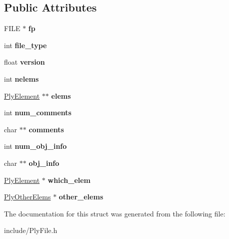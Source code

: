 \subsection*{Public Attributes}
\begin{DoxyCompactItemize}
\item 
\hypertarget{structPlyFile_affa03cb65d7afdc1b54ba1930da1e0ce}{F\-I\-L\-E $\ast$ {\bfseries fp}}\label{structPlyFile_affa03cb65d7afdc1b54ba1930da1e0ce}

\item 
\hypertarget{structPlyFile_ac8f47215e1cab6332c4a91735faceac1}{int {\bfseries file\-\_\-type}}\label{structPlyFile_ac8f47215e1cab6332c4a91735faceac1}

\item 
\hypertarget{structPlyFile_a54079430fc47c9303c194ecffaf9392d}{float {\bfseries version}}\label{structPlyFile_a54079430fc47c9303c194ecffaf9392d}

\item 
\hypertarget{structPlyFile_a2d94dc0c534e364b232d1ea41d64c1f1}{int {\bfseries nelems}}\label{structPlyFile_a2d94dc0c534e364b232d1ea41d64c1f1}

\item 
\hypertarget{structPlyFile_aa123ddfd8c89539dde7644d121082432}{\hyperlink{structPlyElement}{Ply\-Element} $\ast$$\ast$ {\bfseries elems}}\label{structPlyFile_aa123ddfd8c89539dde7644d121082432}

\item 
\hypertarget{structPlyFile_a033842a20f0620979d992898f6a52a14}{int {\bfseries num\-\_\-comments}}\label{structPlyFile_a033842a20f0620979d992898f6a52a14}

\item 
\hypertarget{structPlyFile_afe9f3f406d4ae2ae20d9ed0bfb9a990f}{char $\ast$$\ast$ {\bfseries comments}}\label{structPlyFile_afe9f3f406d4ae2ae20d9ed0bfb9a990f}

\item 
\hypertarget{structPlyFile_aa1a8dc64805585240d50df3192854d18}{int {\bfseries num\-\_\-obj\-\_\-info}}\label{structPlyFile_aa1a8dc64805585240d50df3192854d18}

\item 
\hypertarget{structPlyFile_a5537a09cf69258341126d00e39e13343}{char $\ast$$\ast$ {\bfseries obj\-\_\-info}}\label{structPlyFile_a5537a09cf69258341126d00e39e13343}

\item 
\hypertarget{structPlyFile_a8446d1253e51c33fc1149d87d60d91c9}{\hyperlink{structPlyElement}{Ply\-Element} $\ast$ {\bfseries which\-\_\-elem}}\label{structPlyFile_a8446d1253e51c33fc1149d87d60d91c9}

\item 
\hypertarget{structPlyFile_aceb5a35f93d4ab5df12713e1b62e838b}{\hyperlink{structPlyOtherElems}{Ply\-Other\-Elems} $\ast$ {\bfseries other\-\_\-elems}}\label{structPlyFile_aceb5a35f93d4ab5df12713e1b62e838b}

\end{DoxyCompactItemize}


The documentation for this struct was generated from the following file\-:\begin{DoxyCompactItemize}
\item 
include/Ply\-File.\-h\end{DoxyCompactItemize}
